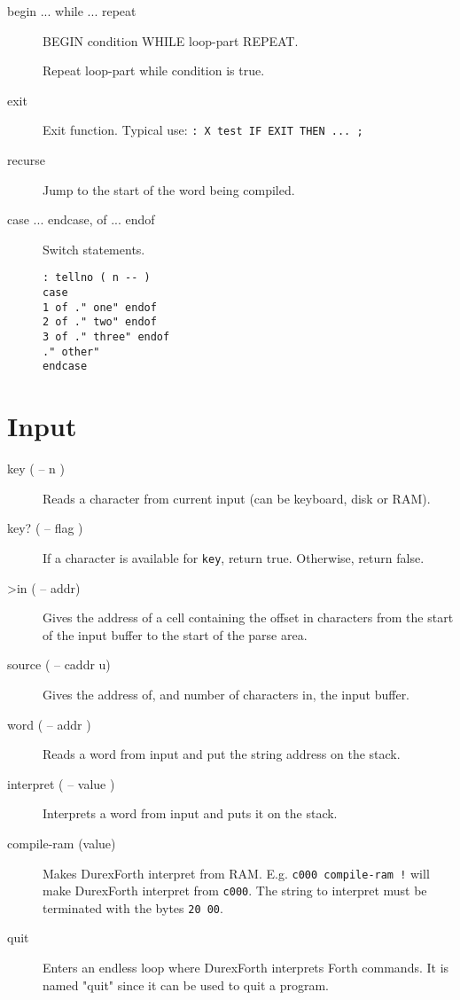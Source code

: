 \begin{description}
\item[begin ... while ... repeat]

BEGIN condition WHILE loop-part REPEAT.

Repeat loop-part while condition is true.

\item[exit]

Exit function. Typical use: \texttt{: X test IF EXIT THEN ... ;}

\item[recurse] Jump to the start of the word being compiled.

\item[case ... endcase, of ... endof] Switch statements.

\begin{verbatim}
: tellno ( n -- )
case
1 of ." one" endof
2 of ." two" endof
3 of ." three" endof
." other"
endcase
\end{verbatim}

\end{description}

\section{Input}

\begin{description}

\item[key ( -- n )] Reads a character from current input (can be keyboard, disk or RAM).
\item[key? ( -- flag )] If a character is available for \texttt{key}, return true. Otherwise, return false.

\item[>in ( -- addr)] Gives the address of a cell containing the offset in characters from the start of the input buffer to the start of the parse area.

\item[source ( -- caddr u)] Gives the address of, and number of characters in, the input buffer.

\item[word ( -- addr )] Reads a word from input and put the string address on the stack.

\item[interpret ( -- value )] Interprets a word from input and puts it on the stack.

\item[compile-ram (value)] Makes DurexForth interpret from RAM.
E.g. \texttt{c000 compile-ram !} will make DurexForth
interpret from \texttt{c000}. The string to interpret
must be terminated with the bytes \texttt{20 00}.

\item[quit] Enters an endless loop where DurexForth interprets Forth commands. It is named "quit" since it can be used to quit a program.

\end{description}


